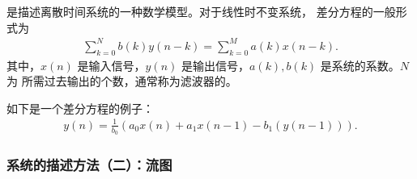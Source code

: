 \begin{definition}[差分方程]
    是描述离散时间系统的一种数学模型。对于线性时不变系统，
    差分方程的一般形式为
    \begin{align*}
        \sum_{k = 0}^{N}b(k)y(n - k) = \sum_{k = 0}^{M}a(k)x(n - k).
    \end{align*}
    其中，$x(n)$ 是输入信号，$y(n)$ 是输出信号，$a(k), b(k)$ 是系统的系数。$N$ 为
    所需过去输出的个数，通常称为滤波器的。
\end{definition}

\begin{example}
    如下是一个差分方程的例子：
    \begin{align*}
        y(n) = \frac{1}{b_0}(a_0x(n) + a_1x(n - 1) - b_1(y(n - 1))).
    \end{align*}
\end{example}

\subsubsection{系统的描述方法（二）：流图}

\label{subsubsection:flow-chart-representation}

